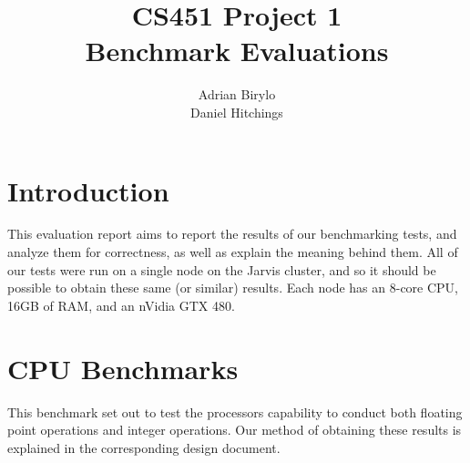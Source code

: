 \documentclass{article}
\title{CS451 Project 1 \\ Benchmark Evaluations}
\author{Adrian Birylo \\ Daniel Hitchings}
\begin{document}
\bigskip
\maketitle
\bigskip 
\bigskip

\section{Introduction}
This evaluation report aims to report the results of our benchmarking tests, and analyze them for correctness, as well as explain the meaning behind them.  All of our tests were run on a single node on the Jarvis cluster, and so it should be possible to obtain these same (or similar) results.  Each node has an 8-core CPU, 16GB of RAM, and an nVidia GTX 480.

\section{CPU Benchmarks}
This benchmark set out to test the processors capability to conduct both floating point operations and integer operations.  Our method of obtaining these results is explained in the corresponding design document.
\end{document}
